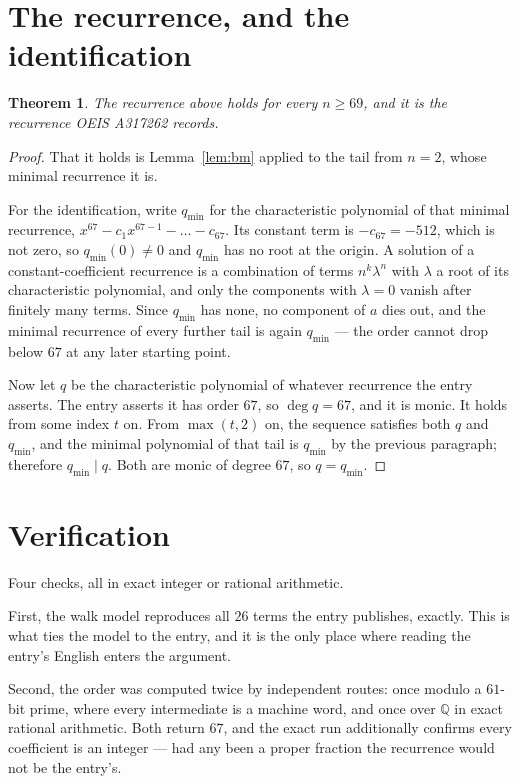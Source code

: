 \documentclass[11pt,a4paper]{article}
\theoremstyle{plain}
\newtheorem{theorem}{Theorem}
\theoremstyle{definition}
\begin{document}
\section{The recurrence, and the identification}

\begin{theorem}
The recurrence above holds for every $n\ge69$, and it is the recurrence OEIS A317262 records.
\end{theorem}

\begin{proof}
That it holds is Lemma~\ref{lem:bm} applied to the tail from $n=2$, whose minimal
recurrence it is.

For the identification, write $q_{\min}$ for the characteristic polynomial of that minimal
recurrence, $x^{67}-c_1x^{67-1}-\dots-c_{67}$. Its constant term is
$-c_{67}=-512$, which is not zero, so $q_{\min}(0)\neq0$ and $q_{\min}$ has no
root at the origin. A solution of a constant-coefficient recurrence is a combination of terms
$n^{k}\lambda^{n}$ with $\lambda$ a root of its characteristic polynomial, and only the
components with $\lambda=0$ vanish after finitely many terms. Since $q_{\min}$ has none, no
component of $a$ dies out, and the minimal recurrence of every further tail is again
$q_{\min}$ --- the order cannot drop below $67$ at any later starting point.

Now let $q$ be the characteristic polynomial of whatever recurrence the entry asserts. The
entry asserts it has order $67$, so $\deg q=67$, and it is monic. It holds from some
index $t$ on. From $\max(t,2)$ on, the sequence satisfies both $q$ and $q_{\min}$, and
the minimal polynomial of that tail is $q_{\min}$ by the previous paragraph; therefore
$q_{\min}\mid q$. Both are monic of degree $67$, so $q=q_{\min}$.
\end{proof}

\section{Verification}

Four checks, all in exact integer or rational arithmetic.

First, the walk model reproduces all $26$ terms the entry publishes, exactly. This is
what ties the model to the entry, and it is the only place where reading the entry's English
enters the argument.

Second, the order was computed twice by independent routes: once modulo a $61$-bit prime, where
every intermediate is a machine word, and once over $\mathbb{Q}$ in exact rational arithmetic.
Both return $67$, and the exact run additionally confirms every coefficient is an integer
--- had any been a proper fraction the recurrence would not be the entry's.
\end{document}

